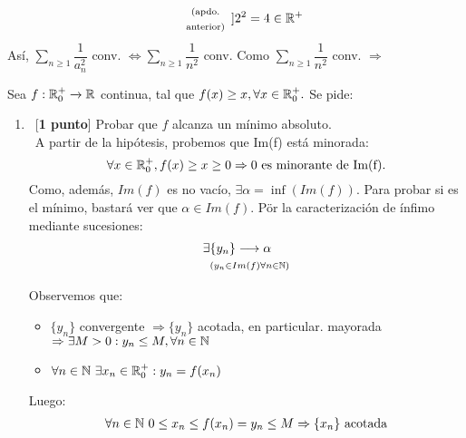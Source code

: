 \documentclass[12pt]{article}
\begin{document}
\begin{ejercicio}
\begin{enumerate}[label=\alph*)]
\begin{equation*}
\begin{array}{cc}
                     & \text{\scriptsize{(apdo.}} \\
                     & \text{\scriptsize{anterior)}}
                \end{array}]{} 2^2 = 4 \in {\mathbb{R}}^+
            \end{equation*}
            Así, $\displaystyle \sum\limits_{n \geq 1} \dfrac{1}{a_n^2}$ conv. $\Leftrightarrow \displaystyle \sum\limits_{n \geq 1} \dfrac{1}{n^2}$ conv. Como $\displaystyle \sum\limits_{n \geq 1} \dfrac{1}{n^2}$  conv. $\Rightarrow$  \\
        \end{enumerate}
    \end{ejercicio}

    \begin{ejercicio}
        Sea $f: {\mathbb{R}}^+_0 \xrightarrow{} {\mathbb{R}}$ continua, tal que $f(x) \geq x, \forall x \in {\mathbb{R}}^+_0.$ Se pide:
        \begin{enumerate}[label=\alph*)]
            \item\ [\textbf{1 punto}] Probar que $f$ alcanza un mínimo absoluto. \\
            \  A partir de la hipótesis, probemos que Im(f) está minorada:
            \begin{equation*}
                \forall x \in {\mathbb{R}}_0^+, f(x) \geq x \geq 0 \Rightarrow 0 \text{ es minorante de Im(f)}. 
            \end{equation*}
            Como, además, $Im(f)$ es no vacío, $\exists \alpha = \inf(Im(f))$. Para probar si es el mínimo, bastará ver que $\alpha \in Im(f)$. Pör la caracterización de ínfimo mediante sucesiones:
            \begin{align*}
                \exists &\{ y_n\} \longrightarrow \alpha \\
                &^{(y_n \in Im(f) \forall n \in {\mathbb{N}})}
            \end{align*}
            Observemos que:
            \begin{itemize}
                \item $\{y_n\}$ convergente $\Rightarrow \{y_n\}$ acotada, en particular. mayorada $\Rightarrow \exists M > 0: y_n \leq M, \forall n \in {\mathbb{N}}$
                \item $\forall n \in {\mathbb{N}} \  \exists x_n \in {\mathbb{R}}_0^+: y_n = f(x_n)$
            \end{itemize}
            Luego:
            \begin{align*}
                \forall n \in \N \ 0 \leq x_n \leq f(x_n) = y_n \leq M \Rightarrow \{x_n\} \text{ acotada}

\end{align*}
\end{enumerate}
\end{ejercicio}
\end{document}

